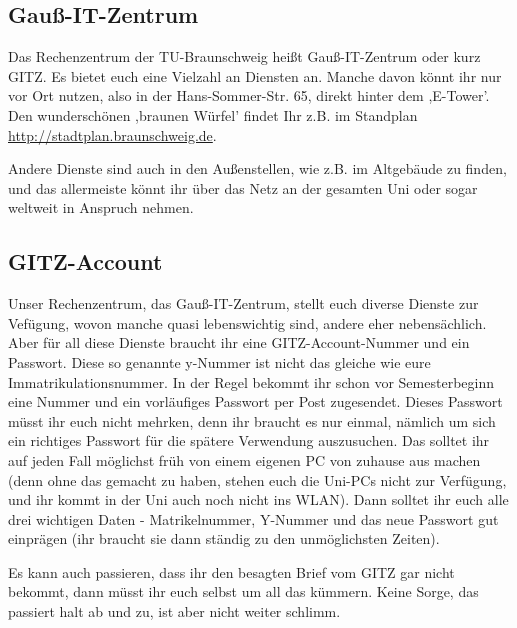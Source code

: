 \begin{multicols}{2}
\subsection{Gauß-IT-Zentrum}

	Das Rechenzentrum der TU-Braunschweig heißt Gauß-IT-Zentrum oder kurz GITZ. Es bietet euch eine Vielzahl an Diensten an. Manche davon könnt ihr nur vor Ort nutzen, also in der Hans-Sommer-Str. 65, direkt hinter dem ,E-Tower'. Den wunderschönen ,braunen Würfel' findet Ihr z.B. im Standplan \url{http://stadtplan.braunschweig.de}.

	Andere Dienste sind auch in den Außenstellen, wie z.B. im Altgebäude zu finden, und das allermeiste könnt ihr über das Netz an der gesamten Uni oder sogar weltweit in Anspruch nehmen.

\subsection{GITZ-Account}
\label{todogitz}
	Unser Rechenzentrum, das Gauß-IT-Zentrum, stellt euch diverse Dienste zur Vefügung, wovon manche quasi lebenswichtig sind, andere eher nebensächlich. Aber für all diese Dienste braucht ihr eine GITZ-Account-Nummer und ein Passwort. Diese so genannte y-Nummer ist nicht das gleiche wie eure Immatrikulationsnummer. In der Regel bekommt ihr schon vor Semesterbeginn eine Nummer und ein vorläufiges Passwort per Post zugesendet. Dieses Passwort müsst ihr euch nicht mehrken, denn ihr braucht es nur einmal, nämlich um sich ein richtiges Passwort für die spätere Verwendung auszusuchen. Das solltet ihr auf jeden Fall möglichst früh von einem eigenen PC von zuhause aus machen (denn ohne das gemacht zu haben, stehen euch die Uni-PCs nicht zur Verfügung, und ihr kommt in der Uni auch noch nicht ins WLAN). Dann solltet ihr euch alle drei wichtigen Daten - Matrikelnummer, Y-Nummer und das neue Passwort gut einprägen (ihr braucht sie dann ständig zu den unmöglichsten Zeiten).

	Es kann auch passieren, dass ihr den besagten Brief vom GITZ  gar nicht bekommt, dann müsst ihr euch selbst um all das kümmern. Keine Sorge, das passiert halt ab und zu, ist aber nicht weiter schlimm.


\end{multicols}
